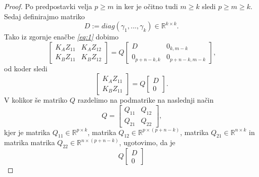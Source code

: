\documentclass[mat1]{article}
\theoremstyle{definition}
\begin{document}
\begin{proof}
Po predpostavki velja $p \geq m$ in ker je očitno tudi $m \geq k$ sledi $p \geq m \geq k$. Sedaj definirajmo matriko 
$$ D := diag(\gamma_1,..., \gamma_k) \in \mathbb{R}^{k \times k} \text{.}
$$
Tako iz zgornje enačbe \textit{\eqref{eq:1}} dobimo
\begin{equation}
\begin{bmatrix}
K_A Z_{11} & K_A Z_{12} \\ 
K_B Z_{11} & K_B Z_{12}
\end{bmatrix} = Q
\begin{bmatrix}
D & 0_{k, m-k} \\ 
0_{p+n-k, k} & 0_{p+n-k, m-k} 
\end{bmatrix} \text{,} \label{eq:2}
\end{equation}
od koder sledi
$$
\begin{bmatrix}
K_A Z_{11} \\ 
K_B Z_{11}
\end{bmatrix} = Q
\begin{bmatrix}
D \\ 
0
\end{bmatrix} \text{.}
$$
V kolikor še matriko $Q$ razdelimo na podmatrike na naslednji način
$$ Q = 
\begin{bmatrix}
Q_{11} & Q_{12} \\ 
Q_{21} & Q_{22}
\end{bmatrix} \text{,}
$$ kjer je matrika $Q_{11} \in \mathbb{R}^{p \times k}$, matrika $Q_{12} \in \mathbb{R}^{p \times (p+n-k)}$, matrika $Q_{21} \in \mathbb{R}^{ n \times k}$ in matrika matrika $Q_{22} \in \mathbb{R}^{ n \times (p+n-k)}$, ugotovimo, da je
$$Q
\begin{bmatrix}
D \\ 
0

\end{bmatrix}$$
\end{proof}
\end{document}
